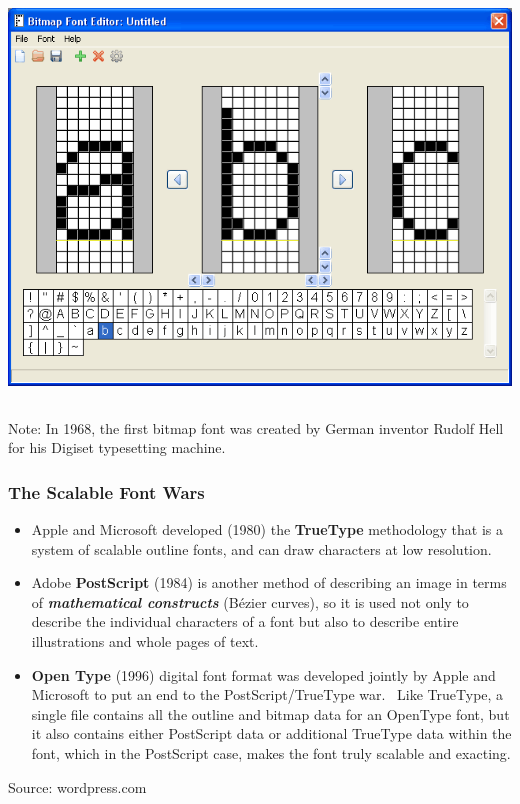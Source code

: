 \documentclass{beamer}
\begin{document}
\begin{frame}
\begin{columns}
\begin{column}{0.55\textwidth}
\begin{center}
    \includegraphics[width=1.0\textwidth]{fig/bitmap-font-abc-example.png}
  \end{center}
  \vfil
\end{column}
\end{columns}

Note: In 1968, the first bitmap font was created by German inventor Rudolf Hell for his Digiset typesetting machine.

\end{frame}


\begin{frame}
\frametitle{The Scalable Font Wars}

\begin{itemize}
\item
  Apple and Microsoft developed (1980) the \textbf{TrueType} methodology
  that is a system of scalable outline fonts, and can draw characters at
  low resolution.
\item
  Adobe \textbf{PostScript} (1984) is another method of describing an
  image in terms of \emph{\textbf{mathematical constructs}} (Bézier
  curves), so it is used not only to describe the individual characters
  of a font but also to describe entire illustrations and whole pages of
  text.
\item
  \textbf{Open Type} (1996) digital font format was developed jointly by
  Apple and Microsoft to put an end to the PostScript/TrueType war.
  ~Like TrueType, a single file contains all the outline and bitmap data
  for an OpenType font, but it also contains either PostScript data or
  additional TrueType data within the font, which in the PostScript
  case, makes the font truly scalable and exacting.
\end{itemize}

Source: wordpress.com

\end{frame}
\end{document}
